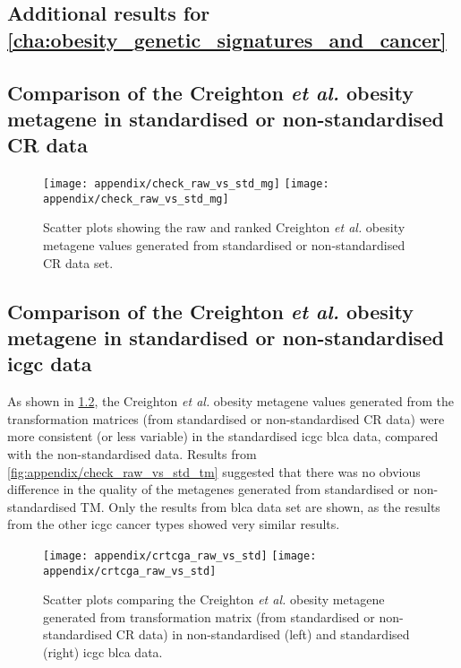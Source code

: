 \begin{appendices}
	\renewcommand{\thesection}{\Alph{chapter}\arabic{section}}

	\chapter{Additional results for \cref{cha:obesity_genetic_signatures_and_cancer}}
	\label{app:a}

	\section{Comparison of the Creighton \textit{et al.} obesity metagene in standardised or non-standardised CR data}
	\label{sec:metagenes_created_from_raw_data_vs_standardised_data}

	\begin{figure}[htpb]
		\centering
		\texttt{[image: appendix/check\_raw\_vs\_std\_mg]}
		\hfill
		\texttt{[image: appendix/check\_raw\_vs\_std\_mg]}
		\caption{Scatter plots showing the raw and ranked Creighton \textit{et al.} obesity metagene values generated from standardised or non-standardised CR data set. }
		\label{fig:appendix/check_raw_vs_std}
	\end{figure}

	\section{Comparison of the Creighton \textit{et al.} obesity metagene in standardised or non-standardised \gls{icgc} data}
	\label{sec:comp_cr_raw_std_icgc}

	As shown in \cref{fig:appendix/check_raw_vs_std}, the Creighton \textit{et al.} obesity metagene values generated from the transformation matrices (from standardised or non-standardised CR data) were more consistent (or less variable) in the standardised \gls{icgc} \gls{blca} data, compared with the non-standardised data.
	Results from \cref{fig:appendix/check_raw_vs_std_tm} suggested that there was no obvious difference in the quality of the metagenes generated from standardised or non-standardised TM.
	Only the results from \gls{blca} data set are shown, as the results from the other \gls{icgc} cancer types showed very similar results.

	\begin{figure}[h]
		\centering
		\texttt{[image: appendix/crtcga\_raw\_vs\_std]}
		\hfill
		\texttt{[image: appendix/crtcga\_raw\_vs\_std]}\\
		\caption{Scatter plots comparing the Creighton \textit{et al.} obesity metagene generated from transformation matrix (from standardised or non-standardised CR data) in non-standardised (left) and standardised (right) \gls{icgc} \gls{blca} data.}
		\label{fig:appendix/check_raw_vs_std}
	\end{figure}


\end{appendices}
